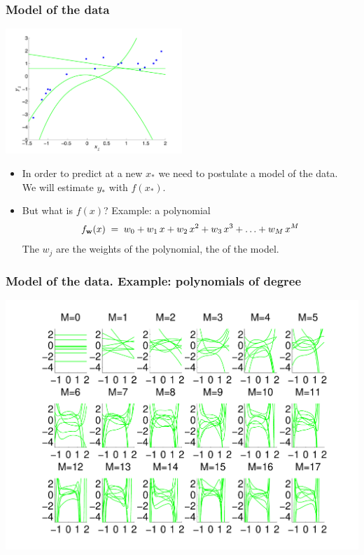 \begin{frame}
\frametitle{Model of the data}

\centerline{\includegraphics[width=0.5\textwidth]{few_random_polynomials.pdf}}

\vfill

\begin{itemize}
\item In order to predict at a new $x_*$ we need to postulate a model of the data.\\
We will estimate $y_*$ with $f(x_*)$.
\item But what is $f(x)$? Example: a polynomial
%
\[
f_\mathbf w(x)\;=\; w_0 + w_1\,x + w_2\,x^2 + w_3\,x^3 + \ldots + w_M\,x^M
\]
%
The $w_j$ are the weights of the polynomial, the  of the model.
\end{itemize}


\end{frame}
\begin{frame}
\frametitle{Model of the data. Example: polynomials of degree }

\centerline{\includegraphics[width=\textwidth]{random_polynomials.pdf}}

\end{frame}
